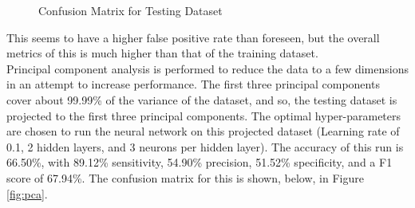 \documentclass[tikz]{article}
\begin{document}
\begin{figure}[H]
\begin{center}
\caption{Confusion Matrix for Testing Dataset}
\label{fig:test}
\end{center}
\end{figure}


This seems to have a higher false positive rate than foreseen, but the overall metrics of this is much higher than that of the training dataset. \\

Principal component analysis is performed to reduce the data to a few dimensions in an attempt to increase performance. The first three principal components cover about 99.99\% of the variance of the dataset, and so, the testing dataset is projected to the first three principal components. The optimal hyper-parameters are chosen to run the neural network on this projected dataset (Learning rate of 0.1, 2 hidden layers, and 3 neurons per hidden layer). The accuracy of this run is 66.50\%, with 89.12\% sensitivity, 54.90\% precision, 51.52\% specificity, and a F1 score of 67.94\%. The confusion matrix for this is shown, below, in Figure \ref{fig:pca}.
\end{document}
